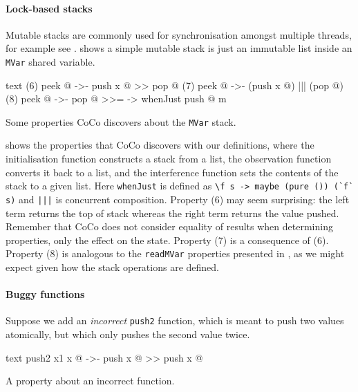 \paragraph{Lock-based stacks}
Mutable stacks are commonly used for synchronisation amongst multiple
threads, for example see \cite{dodds2015}.  shows
a simple mutable stack is just an immutable list inside an \verb|MVar|
shared variable.

\begin{listing}
\centering
\begin{cminted}{text}
(6)  peek @  ->-  push x @ >> pop @
(7)  peek @  ->-  (push x @) ||| (pop @)
(8)  peek @  ->-  pop @ >>= \m -> whenJust push @ m
\end{cminted}
\caption{Some properties CoCo discovers about the \texttt{MVar} stack.}\label{lst:lockstack2}
\end{listing}

 shows the properties that CoCo discovers with
our definitions, where the initialisation function constructs a stack
from a list, the observation function converts it back to a list, and
the interference function sets the contents of the stack to a given
list.  Here \verb|whenJust| is defined as
\verb|\f s -> maybe (pure ()) (`f` s)| and \verb#|||# is concurrent
composition.  Property (6) may seem surprising: the left term returns
the top of stack whereas the right term returns the value pushed.
Remember that CoCo does not consider equality of results when
determining properties, only the effect on the state.  Property (7) is
a consequence of (6).  Property (8) is analogous to the
\verb|readMVar| properties presented in , as we
might expect given how the stack operations are defined.

\paragraph{Buggy functions}
Suppose we add an \emph{incorrect} \verb|push2| function, which is
meant to push two values atomically, but which only pushes the second
value twice.

\begin{listing}
\centering
\begin{cminted}{text}
push2 x1 x @  ->-  push x @ >> push x @
\end{cminted}
\caption{A property about an incorrect function.}\label{lst:lockstack3}
\end{listing}

